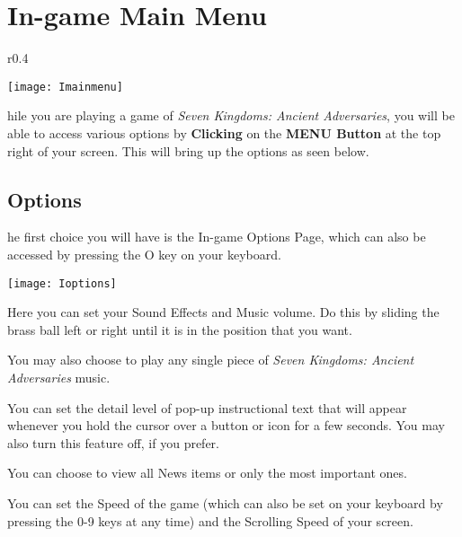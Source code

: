 \section{\textsf{In-game Main Menu}}


\begin{wrapfigure}{r}{0.4\textwidth}
    \begin{center}
        \vspace{-20pt}
        \texttt{[image: Imainmenu]} %
    \end{center}
    \vspace{-40pt}
\end{wrapfigure}

hile you are playing a game of \textit{Seven Kingdoms: Ancient Adversaries}, you will be able to access various options by \textbf{Clicking} on the \textbf{MENU Button} at the top right of your screen. This will bring up the options as seen below.

\subsection{\textsf{Options}}

he first choice you will have is the In-game Options Page, which can also be accessed by pressing the O key on your keyboard.

\begin{center}
    \texttt{[image: Ioptions]} %
\end{center}

Here you can set your Sound Effects and Music volume. Do this by sliding the brass ball left or right until it is in the position that you want.

You may also choose to play any single piece of \textit{Seven Kingdoms: Ancient Adversaries} music.

You can set the detail level of pop-up instructional text that will appear whenever you hold the cursor over a button or icon for a few seconds. You may also turn this feature off, if you prefer.

You can choose to view all News items or only the most important ones.

You can set the Speed of the game (which can also be set on your keyboard by pressing the 0-9 keys at any time) and the Scrolling Speed of your screen.

